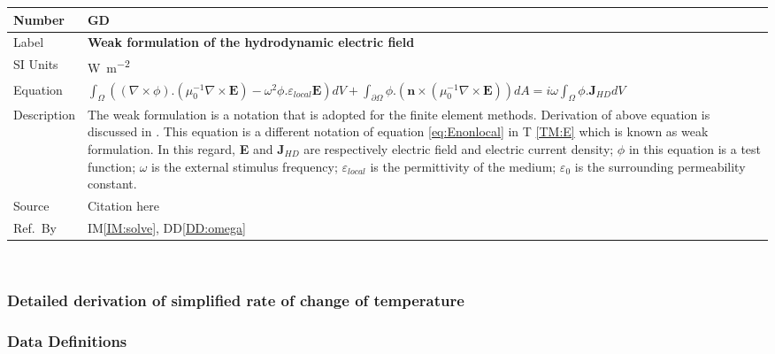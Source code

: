 \documentclass[12pt]{article}
\newcommand{\colBwidth}{0.82\textwidth} \newcommand{\colCwidth}{0.1\textwidth}
\newcounter{defnum} %
\begin{document}
	\noindent \begin{minipage}{\textwidth} \renewcommand*{\arraystretch}{1.5}
		\begin{tabular}{| p{\colAwidth} | p{\colBwidth}|} \hline \rowcolor[gray]{0.9}
			Number& GD{defnum}\thedefnum \label{GD:weakE}\\ \hline Label
			&\bf Weak formulation of the hydrodynamic electric field \\ \hline %
			SI Units&\si{\watt\per\square\metre}\\ \hline Equation& $\int_\Omega ((\nabla
			\times \phi) . (\mu^{-1}_0 \nabla \times \textbf{E})-\omega^2
			\phi.\varepsilon_{local} \textbf{E}) dV + \int_{\partial \Omega}
			\phi.(\textbf{n} \times (\mu^{-1}_0 \nabla \times \textbf{E}))dA = i\omega
			\int_\Omega \phi. \textbf{J}_{HD} dV $ \\ \hline Description & The weak
			formulation is a notation that is adopted for the finite element methods.
			Derivation of above equation is discussed in \cite{hiremath2012numerical}.
			This equation is a different notation of equation \ref{eq:Enonlocal} in T
			\ref{TM:E} which is known as weak formulation.  In this regard, \textbf{E}
			and \textbf{J}$_{HD}$ are respectively electric field and electric current
			density; $\phi$ in this equation is a test function; $\omega$ is the external
			stimulus frequency; $\varepsilon_{local}$ is the permittivity of the medium;
			$\varepsilon_{0}$ is the surrounding permeability constant. \  \\ \hline
			Source & Citation here \\ \hline Ref.\ By & IM\ref{IM:solve},
			DD\ref{DD:omega}\\ \hline \end{tabular} \end{minipage}\\
	
	\subsubsection*{Detailed derivation of simplified rate of change of
		temperature}
	
	
	
	\subsubsection{Data Definitions}\label{sec_datadef}
	
\end{document}
